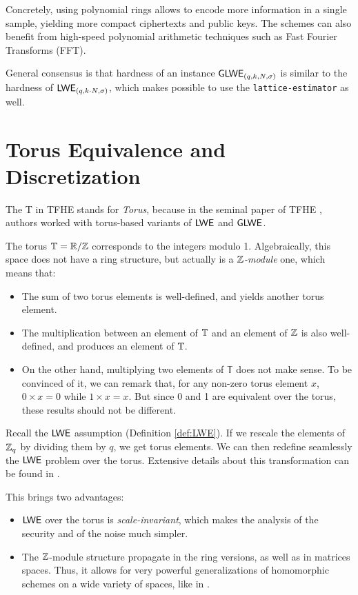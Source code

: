 Concretely, using polynomial rings allows to encode more information in a single sample, yielding more compact ciphertexts and public keys. The schemes can also benefit from high-speed polynomial arithmetic techniques such as Fast Fourier Transforms (FFT). 

General consensus is that hardness of an instance $\textsf{GLWE}_{(q, k, N, \sigma)}$ is similar to the hardness of $\textsf{LWE}_{(q, k \cdot N, \sigma)}$, which makes possible to use the \texttt{lattice-estimator} as well.


\section{Torus Equivalence and Discretization}
\label{sec:torus_equivalence}


The T in TFHE stands for \textit{Torus}, because in the seminal paper of TFHE \cite{JC:CGGI20}, authors worked with torus-based variants of $\textsf{LWE}$ and $\textsf{GLWE}$.


The torus $\mathbb{T} = \mathbb{R} / \mathbb{Z}$ corresponds to the integers modulo 1. Algebraically, this space does not have a ring structure, but actually is a \textit{$\mathbb{Z}$-module} one, which means that:

\begin{itemize}
	\item The sum of two torus elements is well-defined, and yields another torus element.
	\item The multiplication between an element of $\mathbb{T}$ and an element of $\mathbb{Z}$ is also well-defined, and produces an element of $\mathbb{T}$.
	\item On the other hand, multiplying two elements of $\mathbb T$ does not make sense. To be convinced of it, we can remark that, for any non-zero torus element $x$, $0 \times x = 0$ while $1 \times x = x$. But since 0 and 1 are equivalent over the torus, these results should not be different. 
\end{itemize}



Recall the $\textsf{LWE}$ assumption (Definition \ref{def:LWE}). If we rescale the elements of $\mathbb{Z}_q$ by dividing them by $q$, we get torus elements. We can then redefine seamlessly the $\textsf{LWE}$ problem over the torus. Extensive details about this transformation can be found in \cite{these_chillotti}.


This brings two advantages:

\begin{itemize}
	\item $\textsf{LWE}$ over the torus is \textit{scale-invariant}, which makes the analysis of the security and of the noise much simpler.
	\item The $\mathbb{Z}$-module structure propagate in the ring versions, as well as in matrices spaces. Thus, it allows for very powerful generalizations of homomorphic schemes on a wide variety of spaces, like in \cite{chimera, chimera2}.
\end{itemize} 


